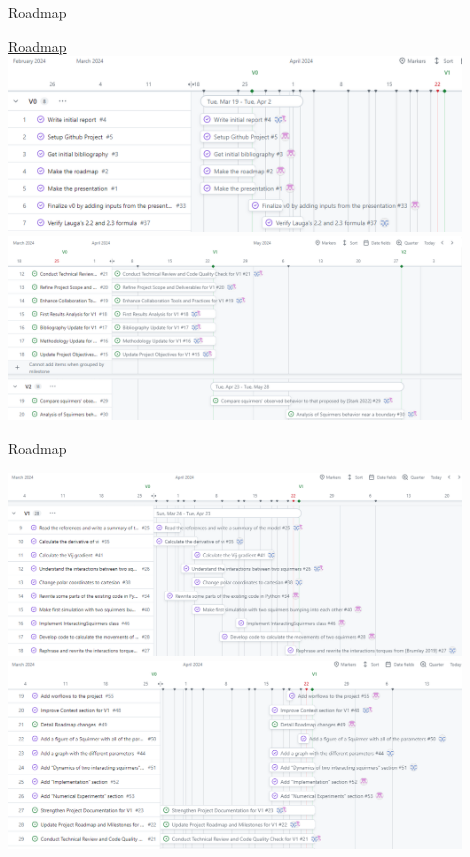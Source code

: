 \documentclass{beamer}
\begin{document}
\begin{frame}{Roadmap}
    \begin{center}
        \href{https://github.com/orgs/master-csmi/projects/23/views/2}{Roadmap}
        \includegraphics[width=0.9\textwidth]{../images/roadmapV0_1.png}
        \vspace{1em}
        \includegraphics[width=0.9\textwidth]{../images/roadmapV0_2.png}
    \end{center}
\end{frame}
\begin{frame}{Roadmap}
    \begin{center}
        \includegraphics[width=0.9\textwidth]{../images/roadmapV1_1.png}
        \vspace{1em}
        \includegraphics[width=0.9\textwidth]{../images/roadmapV1_2.png}
    \end{center}
\end{frame}
\end{document}
